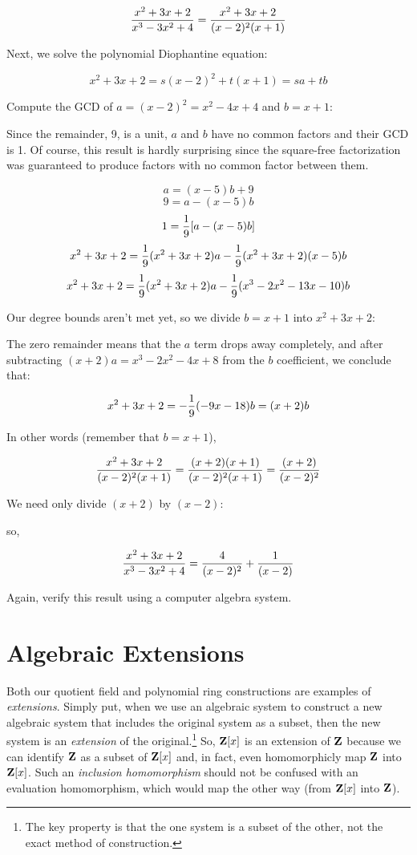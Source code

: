 $${{x^2 + 3x + 2}\over{x^3-3x^2+4}} = {{x^2 + 3x + 2}\over{(x-2)^2(x+1)}}$$

Next, we solve the polynomial Diophantine equation:

$$x^2 + 3x + 2 = s(x-2)^2 + t(x+1) = sa+tb$$

Compute the GCD of $a=(x-2)^2=x^2-4x+4$ and $b=x+1$:



Since the remainder, 9, is a unit, $a$ and $b$ have no common
factors and their GCD is 1.  Of course, this result is hardly
surprising since the square-free factorization was guaranteed
to produce factors with no common factor between them.

$$a=(x-5)b+9$$
$$9=a-(x-5)b$$
$$1={1\over9}[a-(x-5)b]$$
$$x^2 + 3x + 2 = {1\over9}(x^2+3x+2)a-{1\over9}(x^2+3x+2)(x-5)b$$
$$x^2 + 3x + 2 = {1\over9}(x^2+3x+2)a-{1\over9}(x^3-2x^2-13x-10)b$$

Our degree bounds aren't met yet, so we divide $b=x+1$ into $x^2+3x+2$:



The zero remainder means that the $a$ term drops away completely,
and after subtracting $(x+2)a=x^3-2x^2-4x+8$ from the $b$ coefficient,
we conclude that:

$$x^2 + 3x + 2 = -{1\over9}(-9x-18)b = (x+2)b$$

In other words (remember that $b=x+1$),

$${{x^2 + 3x + 2}\over{(x-2)^2(x+1)}} = {{(x+2)(x+1)}\over{(x-2)^2(x+1)}} = {{(x+2)}\over{(x-2)^2}}$$

We need only divide $(x+2)$ by $(x-2)$:




so,

$${{x^2 + 3x + 2}\over{x^3-3x^2+4}} = {4\over{(x-2)^2}} + {1\over{(x-2)}}$$

Again, verify this result using a computer algebra system.

\vfill\eject


\section{Algebraic Extensions}

Both our quotient field and polynomial ring constructions are examples
of {\it extensions}.  Simply put, when we use an algebraic system to
construct a new algebraic system that includes the original system as
a subset, then the new system is an {\it extension} of the
original.\footnote{The key property is that the one system is a subset
of the other, not the exact method of construction.}  So, ${\bf Z}[x]$
is an extension of ${\bf Z}$ because we can identify ${\bf Z}$ as a
subset of ${\bf Z}[x]$ and, in fact, even homomorphicly map ${\bf Z}$
into ${\bf Z}[x]$.  Such an {\it inclusion homomorphism} should not be
confused with an evaluation homomorphism, which would map the other
way (from ${\bf Z}[x]$ into ${\bf Z}$).

